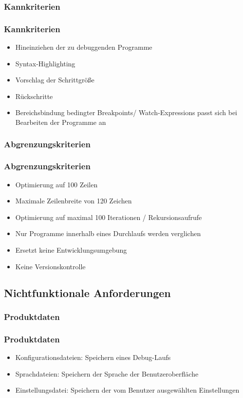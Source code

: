 \documentclass{beamer}
\begin{document}
\subsubsection{Kannkriterien}
\begin{frame}
\frametitle{Kannkriterien}
\begin{itemize}
\item Hineinziehen der zu debuggenden Programme
\item Syntax-Highlighting
\item Vorschlag der Schrittgröße
\item Rückschritte
\item Bereichsbindung bedingter Breakpoints/ Watch-Expressions passt sich bei Bearbeiten der Programme an
\end{itemize}
\end{frame}
\subsubsection{Abgrenzungskriterien}
\begin{frame}
\frametitle{Abgrenzungskriterien}
\begin{itemize}
\item Optimierung auf 100 Zeilen
\item Maximale Zeilenbreite von 120 Zeichen
\item Optimierung auf maximal 100 Iterationen / Rekursionsaufrufe
\item Nur Programme innerhalb eines Durchlaufs werden verglichen
\item Ersetzt keine Entwicklungsumgebung
\item Keine Versionskontrolle
\end{itemize}
\end{frame}


\subsection{Nichtfunktionale Anforderungen}
\subsubsection{Produktdaten}
\begin{frame}
\frametitle{Produktdaten}
\begin{itemize}
\item Konfigurationsdateien: Speichern eines Debug-Laufs
\item Sprachdateien: Speichern der Sprache der Benutzeroberfläche
\item Einstellungsdatei: Speichern der vom Benutzer ausgewählten Einstellungen
\end{itemize}
\end{frame}
\end{document}
